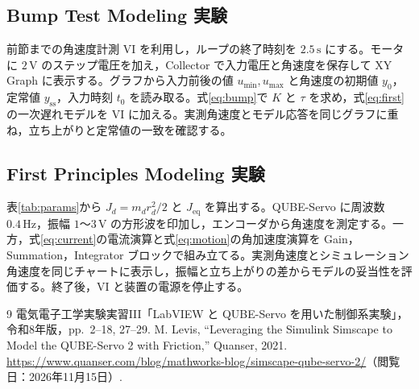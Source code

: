 \documentclass[dvipdfmx,a4paper,11pt]{jsarticle}
\begin{document}
\clearpage
\subsection{Bump Test Modeling 実験}
前節までの角速度計測 VI を利用し，ループの終了時刻を $2.5\,\mathrm{s}$ にする。モータに $2\,\mathrm{V}$ のステップ電圧を加え，Collector で入力電圧と角速度を保存して XY Graph に表示する。グラフから入力前後の値 $u_{\min},u_{\max}$ と角速度の初期値 $y_0$，定常値 $y_{\mathrm{ss}}$，入力時刻 $t_0$ を読み取る。式\eqref{eq:bump}で $K$ と $\tau$ を求め，式\eqref{eq:first}の一次遅れモデルを VI に加える。実測角速度とモデル応答を同じグラフに重ね，立ち上がりと定常値の一致を確認する。

\subsection{First Principles Modeling 実験}
表\ref{tab:params}から $J_d=m_dr_d^2/2$ と $J_{\mathrm{eq}}$ を算出する。QUBE-Servo に周波数 $0.4\,\mathrm{Hz}$，振幅 $1$～$3\,\mathrm{V}$ の方形波を印加し，エンコーダから角速度を測定する。一方，式\eqref{eq:current}の電流演算と式\eqref{eq:motion}の角加速度演算を Gain，Summation，Integrator ブロックで組み立てる。実測角速度とシミュレーション角速度を同じチャートに表示し，振幅と立ち上がりの差からモデルの妥当性を評価する。終了後，VI と装置の電源を停止する。





\begin{thebibliography}{9}
 電気電子工学実験実習III「LabVIEW と QUBE-Servo を用いた制御系実験」，令和8年版，pp.~2--18, 27--29.
 M. Levis, ``Leveraging the Simulink Simscape to Model the QUBE-Servo 2 with Friction,'' Quanser, 2021. \url{https://www.quanser.com/blog/mathworks-blog/simscape-qube-servo-2/}（閲覧日：2026年11月15日）.
\end{thebibliography}
\end{document}
